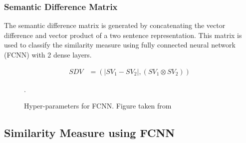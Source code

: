 \documentclass[12pt]{report} %
\begin{document}
	
	\subsubsection*{Semantic Difference Matrix}
	The semantic difference matrix is generated by concatenating the vector difference and vector product of a two sentence representation. This matrix is used to classify the similarity measure using fully connected neural network (FCNN) with 2 dense layers. 
	
		\begin{align} 
			SDV & =(|SV_{1}- SV_{2}|,(SV_{1} \otimes SV_{2}))
		\end{align}
	
	\begin{figure}[hbp]
		\centering
		\caption{Hyper-parameters for FCNN. Figure taken from \cite{shao2017hcti}}.
		\label{params}
	\end{figure}
	
	\subsection{Similarity Measure using FCNN}
	
\end{document}
